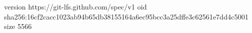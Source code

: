 version https://git-lfs.github.com/spec/v1
oid sha256:16cf2cacc1023ab94b65db38155164a6ec95bcc3a25dffe3c62561e7dd4c5001
size 5566
